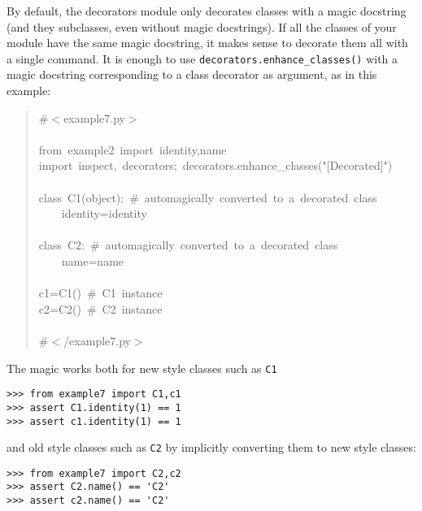 \documentclass[11pt,english]{article}
\begin{document}
By default, the decorators module only decorates classes with a magic 
docstring (and they subclasses, even without magic docstrings). 
If all the classes of your module have the same magic docstring, 
it makes sense to decorate them all
with a single command. It is enough to use \texttt{decorators.enhance{\_}classes()}
with a magic docstring corresponding to a class decorator as argument, 
as in this example:
\begin{quote}
\begin{ttfamily}\begin{flushleft}
\mbox{{\#}{$<$}example7.py{$>$}}\\
\mbox{}\\
\mbox{from~example2~import~identity,name}\\
\mbox{import~inspect,~decorators;~decorators.enhance{\_}classes("[Decorated]")}\\
\mbox{}\\
\mbox{class~C1(object):~{\#}~automagically~converted~to~a~decorated~class}\\
\mbox{~~~~identity=identity~}\\
\mbox{}\\
\mbox{class~C2:~{\#}~automagically~converted~to~a~decorated~class}\\
\mbox{~~~~name=name}\\
\mbox{}\\
\mbox{c1=C1()~{\#}~C1~instance}\\
\mbox{c2=C2()~{\#}~C2~instance}\\
\mbox{}\\
\mbox{{\#}{$<$}/example7.py{$>$}}
\end{flushleft}\end{ttfamily}
\end{quote}

The magic works both for new style classes such as \texttt{C1}
\begin{verbatim}>>> from example7 import C1,c1
>>> assert C1.identity(1) == 1
>>> assert c1.identity(1) == 1 \end{verbatim}

and old style classes such as \texttt{C2} by implicitly converting them
to new style classes:
\begin{verbatim}>>> from example7 import C2,c2 
>>> assert C2.name() == 'C2'
>>> assert c2.name() == 'C2' \end{verbatim}


\end{document}
